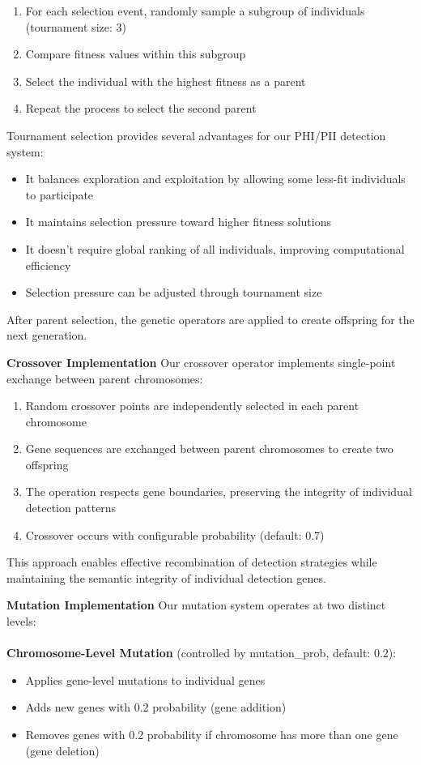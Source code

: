\documentclass[conference]{IEEEtran}
\begin{document}
\begin{enumerate}
\item For each selection event, randomly sample a subgroup of individuals (tournament size: 3)
\item Compare fitness values within this subgroup
\item Select the individual with the highest fitness as a parent
\item Repeat the process to select the second parent
\end{enumerate}

Tournament selection provides several advantages for our PHI/PII detection system:
\begin{itemize}
\item It balances exploration and exploitation by allowing some less-fit individuals to participate
\item It maintains selection pressure toward higher fitness solutions
\item It doesn't require global ranking of all individuals, improving computational efficiency
\item Selection pressure can be adjusted through tournament size
\end{itemize}

After parent selection, the genetic operators are applied to create offspring for the next generation.

\textbf{Crossover Implementation}
Our crossover operator implements single-point exchange between parent chromosomes:

\begin{enumerate}
\item Random crossover points are independently selected in each parent chromosome
\item Gene sequences are exchanged between parent chromosomes to create two offspring
\item The operation respects gene boundaries, preserving the integrity of individual detection patterns
\item Crossover occurs with configurable probability (default: 0.7)
\end{enumerate}

This approach enables effective recombination of detection strategies while maintaining the semantic integrity of individual detection genes.

\textbf{{Mutation Implementation}}
Our mutation system operates at two distinct levels:
\\
\\
\textbf{Chromosome-Level Mutation} (controlled by mutation\_prob, default: 0.2):
\begin{itemize}
\item Applies gene-level mutations to individual genes
\item Adds new genes with 0.2 probability (gene addition)
\item Removes genes with 0.2 probability if chromosome has more than one gene (gene deletion)
\end{itemize}
\end{document}
